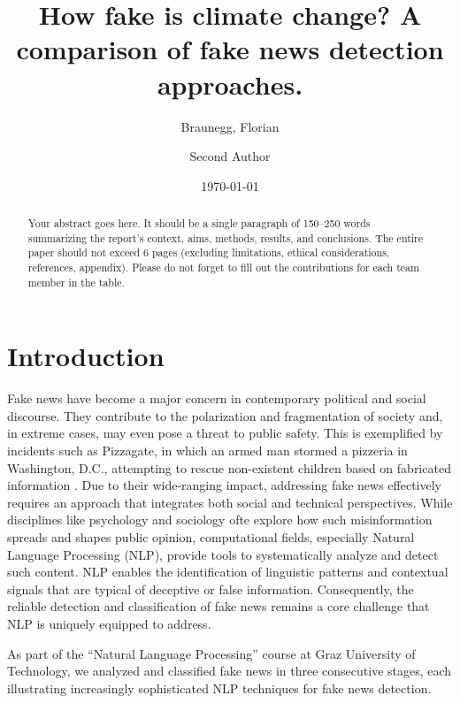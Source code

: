\documentclass[12pt,a4paper,twocolumn]{article}
\title{How fake is climate change? A comparison of fake news detection approaches.} %
\author[1]{Braunegg, Florian} %
\author[2]{Second Author}
\affil[1]{Graz University of Technology, Graz, Austria}
\affil[2]{University of Graz, Graz, Austria}
\date{\today}
\begin{document}
\maketitle


\begin{abstract}
    Your abstract goes here. It should be a single paragraph of 150--250 words summarizing the report’s context, aims, methods, results, and conclusions.
    The entire paper should not exceed 6 pages (excluding limitations, ethical considerations, references, appendix).
    Please do not forget to fill out the contributions for each team member in the table.
\end{abstract}

\section{Introduction}
\label{sec:intro}
Fake news have become a major concern in contemporary political and social discourse. They contribute to the polarization and fragmentation of society \citep{au2022role} and, in extreme cases, may even pose a threat to public safety. This is exemplified by incidents such as Pizzagate, in which an armed man stormed a pizzeria in Washington, D.C., attempting to rescue non-existent children based on fabricated information \citep{2016pizzagate}. Due to their wide-ranging impact, addressing fake news effectively requires an approach that integrates both social and technical perspectives. While disciplines like psychology and sociology ofte explore how such misinformation spreads and shapes public opinion, computational fields, especially Natural Language Processing (NLP), provide tools to systematically analyze and detect such content. NLP enables the identification of linguistic patterns and contextual signals that are typical of deceptive or false information. Consequently, the reliable detection and classification of fake news remains a core challenge that NLP is uniquely equipped to address.

As part of the “Natural Language Processing” course at Graz University of Technology, we analyzed and classified fake news in three consecutive stages, each illustrating increasingly sophisticated NLP techniques for fake news detection.
\end{document}
